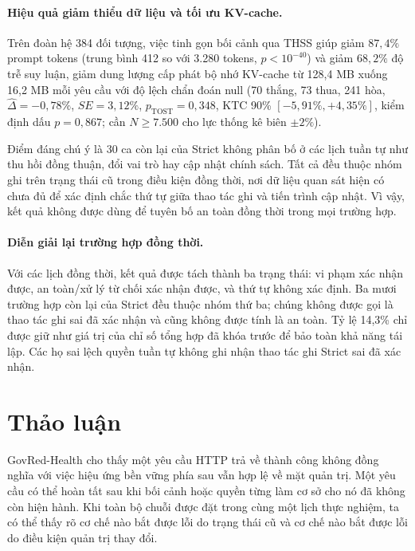 \documentclass[11pt]{article}
\begin{document}
\paragraph{Hiệu quả giảm thiểu dữ liệu và tối ưu KV-cache.} Trên đoàn hệ 384 đối tượng, việc tinh gọn bối cảnh qua THSS giúp giảm $87{,}4\%$ prompt tokens (trung bình 412 so với 3.280 tokens, $p < 10^{-40}$) và giảm $68{,}2\%$ độ trễ suy luận, giảm dung lượng cấp phát bộ nhớ KV-cache từ 128,4 MB xuống 16,2 MB mỗi yêu cầu với độ lệch chẩn đoán null (70 thắng, 73 thua, 241 hòa, $\hat{\Delta} = -0{,}78\%$, $SE = 3{,}12\%$, $p_{\text{TOST}} = 0{,}348$, KTC 90\% $[-5{,}91\%, +4{,}35\%]$, kiểm định dấu $p=0{,}867$; cần $N \ge 7.500$ cho lực thống kê biên $\pm 2\%$).

Điểm đáng chú ý là 30 ca còn lại của Strict không phân bố ở các lịch tuần tự như thu hồi đồng thuận, đổi vai trò hay cập nhật chính sách. Tất cả đều thuộc nhóm ghi trên trạng thái cũ trong điều kiện đồng thời, nơi dữ liệu quan sát hiện có chưa đủ để xác định chắc thứ tự giữa thao tác ghi và tiến trình cập nhật. Vì vậy, kết quả không được dùng để tuyên bố an toàn đồng thời trong mọi trường hợp.

\paragraph{Diễn giải lại trường hợp đồng thời.} Với các lịch đồng thời, kết quả được tách thành ba trạng thái: vi phạm xác nhận được, an toàn/xử lý từ chối xác nhận được, và thứ tự không xác định. Ba mươi trường hợp còn lại của Strict đều thuộc nhóm thứ ba; chúng không được gọi là thao tác ghi sai đã xác nhận và cũng không được tính là an toàn. Tỷ lệ 14,3\% chỉ được giữ như giá trị của chỉ số tổng hợp đã khóa trước để bảo toàn khả năng tái lập. Các họ sai lệch quyền tuần tự không ghi nhận thao tác ghi Strict sai đã xác nhận.\par

\section{Thảo luận}
GovRed-Health cho thấy một yêu cầu HTTP trả về thành công không đồng nghĩa với việc hiệu ứng bền vững phía sau vẫn hợp lệ về mặt quản trị. Một yêu cầu có thể hoàn tất sau khi bối cảnh hoặc quyền từng làm cơ sở cho nó đã không còn hiện hành. Khi toàn bộ chuỗi được đặt trong cùng một lịch thực nghiệm, ta có thể thấy rõ cơ chế nào bắt được lỗi do trạng thái cũ và cơ chế nào bắt được lỗi do điều kiện quản trị thay đổi.
\end{document}

